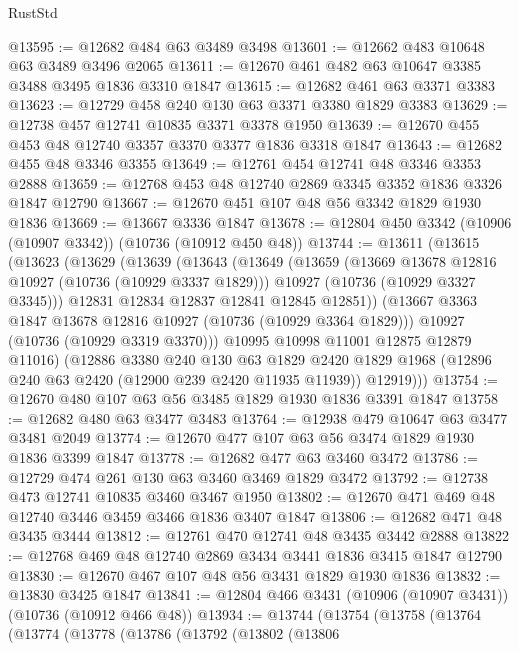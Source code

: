 \begin{lexlean}{RustStd}
\begin{coremodule}
@13595 := @12682 @484 @63 @3489 @3498
@13601 := @12662 @483 @10648 @63 @3489 @3496 @2065
@13611 := @12670 @461 @482 @63 @10647 @3385 @3488 @3495 @1836 @3310 @1847
@13615 := @12682 @461 @63 @3371 @3383
@13623 := @12729 @458 @240 @130 @63 @3371 @3380 @1829 @3383
@13629 := @12738 @457 @12741 @10835 @3371 @3378 @1950
@13639 := @12670 @455 @453 @48 @12740 @3357 @3370 @3377 @1836 @3318 @1847
@13643 := @12682 @455 @48 @3346 @3355
@13649 := @12761 @454 @12741 @48 @3346 @3353 @2888
@13659 := @12768 @453 @48 @12740 @2869 @3345 @3352 @1836 @3326 @1847 @12790
@13667 := @12670 @451 @107 @48 @56 @3342 @1829 @1930 @1836
@13669 := @13667 @3336 @1847
@13678 := @12804 @450 @3342 (@10906 (@10907 @3342)) (@10736 (@10912 @450 @48))
@13744 := @13611
    (@13615
      (@13623
        (@13629
          (@13639
            (@13643
              (@13649
                (@13659
                  (@13669 @13678 @12816 @10927 (@10736 (@10929 @3337 @1829)))
                  @10927
                  (@10736 (@10929 @3327 @3345)))
                @12831
                @12834
                @12837
                @12841
                @12845
                @12851))
            (@13667 @3363 @1847 @13678 @12816 @10927 (@10736 (@10929 @3364 @1829)))
            @10927
            (@10736 (@10929 @3319 @3370)))
          @10995
          @10998
          @11001
          @12875
          @12879
          @11016)
        (@12886
          @3380
          @240
          @130
          @63
          @1829
          @2420
          @1829
          @1968
          (@12896 @240 @63 @2420 (@12900 @239 @2420 @11935 @11939))
          @12919)))
@13754 := @12670 @480 @107 @63 @56 @3485 @1829 @1930 @1836 @3391 @1847
@13758 := @12682 @480 @63 @3477 @3483
@13764 := @12938 @479 @10647 @63 @3477 @3481 @2049
@13774 := @12670 @477 @107 @63 @56 @3474 @1829 @1930 @1836 @3399 @1847
@13778 := @12682 @477 @63 @3460 @3472
@13786 := @12729 @474 @261 @130 @63 @3460 @3469 @1829 @3472
@13792 := @12738 @473 @12741 @10835 @3460 @3467 @1950
@13802 := @12670 @471 @469 @48 @12740 @3446 @3459 @3466 @1836 @3407 @1847
@13806 := @12682 @471 @48 @3435 @3444
@13812 := @12761 @470 @12741 @48 @3435 @3442 @2888
@13822 := @12768 @469 @48 @12740 @2869 @3434 @3441 @1836 @3415 @1847 @12790
@13830 := @12670 @467 @107 @48 @56 @3431 @1829 @1930 @1836
@13832 := @13830 @3425 @1847
@13841 := @12804 @466 @3431 (@10906 (@10907 @3431)) (@10736 (@10912 @466 @48))
@13934 := @13744
    (@13754
      (@13758
        (@13764
          (@13774
            (@13778
              (@13786
                (@13792
                  (@13802
                    (@13806

\end{coremodule}
\end{lexlean}
